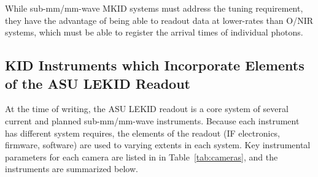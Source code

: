 {While sub-mm/mm-wave MKID systems must address the tuning requirement, they have the advantage of being able to readout data at lower-rates than O/NIR systems, which must be able to register the arrival times of individual photons.

\subsection{KID Instruments which Incorporate Elements of the ASU LEKID Readout}

At the time of writing, the ASU LEKID readout is a core system of several current and planned sub-mm/mm-wave instruments. Because each instrument has different system requires, the elements of the readout (IF electronics, firmware, software) are used to varying extents in each system. Key instrumental parameters for each camera are listed in in Table~\ref{tab:cameras}, and the instruments are summarized below.

}
